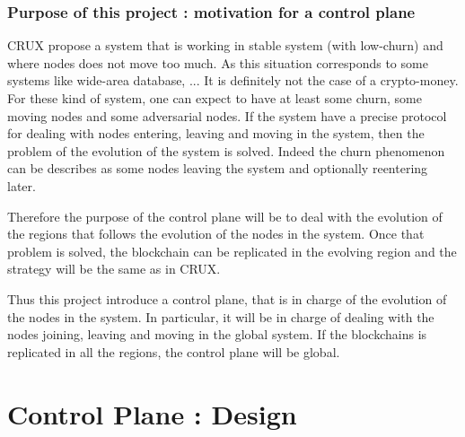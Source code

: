 \documentclass[a4paper,11pt,oneside]{report}
\begin{document}

\subsection{Purpose of this project : motivation for a control plane}
CRUX propose a system that is working in stable system (with low-churn) and where nodes does not move too much. As this situation corresponds to some systems like wide-area database, ... It is definitely not the case of a crypto-money. For these kind of system, one can expect to have at least some churn, some moving nodes and some adversarial nodes. 
If the system have a precise protocol for dealing with nodes entering, leaving and moving in the system, then the problem of the evolution of the system is solved. Indeed the churn phenomenon can be describes as some nodes leaving the system and optionally reentering later. 

Therefore the purpose of the control plane will be to deal with the evolution of the regions that follows the evolution of the nodes in the system. Once that problem is solved, the blockchain can be replicated in the evolving region and the strategy will be the same as in CRUX. 

Thus this project introduce a control plane, that is in charge of the evolution of the nodes in the system. In particular, it will be in charge of dealing with the nodes joining, leaving and moving in the global system. If the blockchains is replicated in all the regions, the control plane will be global. 

\chapter{Control Plane : Design}

\end{document}
